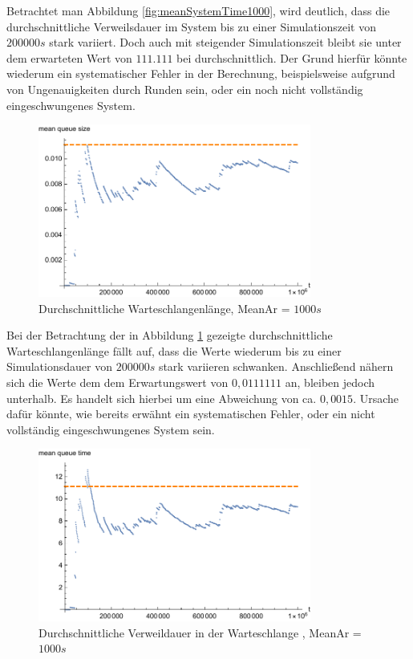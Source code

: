 Betrachtet man Abbildung \ref{fig:meanSystemTime1000}, wird deutlich, dass die durchschnittliche Verweilsdauer im System bis zu einer Simulationszeit von $200000s$ stark variiert. Doch auch mit steigender Simulationszeit bleibt sie unter dem erwarteten Wert von $111.111$ bei durchschnittlich. Der Grund hierfür könnte wiederum ein systematischer Fehler in der Berechnung, beispielsweise aufgrund von Ungenauigkeiten durch Runden sein, oder ein noch nicht vollständig eingeschwungenes System.

\begin{figure}[htpb]
	\centering
	\includegraphics[width=0.8\textwidth]{abbildungen/1_Phone/Arrival_1000_Serve_100_dur_1000000_Skip_0/MeanQueueSize.pdf}
	\caption{Durchschnittliche Warteschlangenlänge, MeanAr = $1000s$}
	\label{fig:meanQueueSize1000}
\end{figure}

Bei der Betrachtung der in Abbildung \ref{fig:meanQueueSize1000} gezeigte durchschnittliche Warteschlangenlänge fällt auf, dass die Werte wiederum bis zu einer Simulationsdauer von $200000s$ stark variieren schwanken. Anschließend nähern sich die Werte dem dem Erwartungswert von $0,0111111$ an, bleiben jedoch unterhalb. Es handelt sich hierbei um eine Abweichung von ca. $0,0015$. Ursache dafür könnte, wie bereits erwähnt ein systematischen Fehler, oder ein nicht vollständig eingeschwungenes System sein.

\begin{figure}[htpb]
	\centering
	\includegraphics[width=0.8\textwidth]{abbildungen/1_Phone/Arrival_1000_Serve_100_dur_1000000_Skip_0/MeanQueueTime.pdf}
	\caption{Durchschnittliche Verweildauer in der Warteschlange , MeanAr = $1000s$}
	\label{fig:meanQueueTime1000}
\end{figure}

